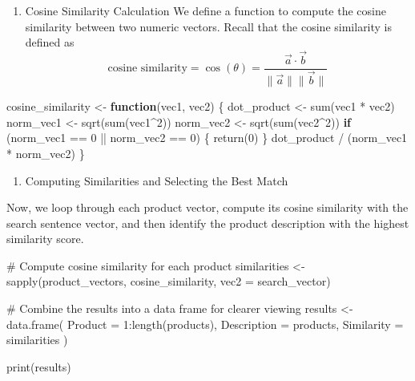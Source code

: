 \documentclass[
  letterpaper,
  DIV=11,
  numbers=noendperiod]{scrartcl}
\newenvironment{Shaded}{\begin{snugshade}}{\end{snugshade}}
\newcommand{\AttributeTok}[1]{\textcolor[rgb]{0.40,0.45,0.13}{#1}}
\newcommand{\CommentTok}[1]{\textcolor[rgb]{0.37,0.37,0.37}{#1}}
\newcommand{\ControlFlowTok}[1]{\textcolor[rgb]{0.00,0.23,0.31}{\textbf{#1}}}
\newcommand{\DecValTok}[1]{\textcolor[rgb]{0.68,0.00,0.00}{#1}}
\newcommand{\FunctionTok}[1]{\textcolor[rgb]{0.28,0.35,0.67}{#1}}
\newcommand{\NormalTok}[1]{\textcolor[rgb]{0.00,0.23,0.31}{#1}}
\newcommand{\OtherTok}[1]{\textcolor[rgb]{0.00,0.23,0.31}{#1}}
\newcommand{\SpecialCharTok}[1]{\textcolor[rgb]{0.37,0.37,0.37}{#1}}
\providecommand{\tightlist}{%
  \setlength{\itemsep}{0pt}\setlength{\parskip}{0pt}}
\begin{document}
\begin{enumerate}
\def\labelenumi{\arabic{enumi}.}
\setcounter{enumi}{1}
\tightlist
\item
  Cosine Similarity Calculation We define a function to compute the
  cosine similarity between two numeric vectors. Recall that the cosine
  similarity is defined as \[
  \text{cosine similarity} = \cos(\theta) = \frac{\vec{a} \cdot \vec{b}}{\|\vec{a}\| \|\vec{b}\|}
  \]
\end{enumerate}

\begin{Shaded}
\begin{Highlighting}[]
\NormalTok{cosine\_similarity }\OtherTok{\textless{}{-}} \ControlFlowTok{function}\NormalTok{(vec1, vec2) \{}
\NormalTok{  dot\_product }\OtherTok{\textless{}{-}} \FunctionTok{sum}\NormalTok{(vec1 }\SpecialCharTok{*}\NormalTok{ vec2)}
\NormalTok{  norm\_vec1 }\OtherTok{\textless{}{-}} \FunctionTok{sqrt}\NormalTok{(}\FunctionTok{sum}\NormalTok{(vec1}\SpecialCharTok{\^{}}\DecValTok{2}\NormalTok{))}
\NormalTok{  norm\_vec2 }\OtherTok{\textless{}{-}} \FunctionTok{sqrt}\NormalTok{(}\FunctionTok{sum}\NormalTok{(vec2}\SpecialCharTok{\^{}}\DecValTok{2}\NormalTok{))}
  \ControlFlowTok{if}\NormalTok{ (norm\_vec1 }\SpecialCharTok{==} \DecValTok{0} \SpecialCharTok{||}\NormalTok{ norm\_vec2 }\SpecialCharTok{==} \DecValTok{0}\NormalTok{) \{}
    \FunctionTok{return}\NormalTok{(}\DecValTok{0}\NormalTok{)}
\NormalTok{  \}}
\NormalTok{  dot\_product }\SpecialCharTok{/}\NormalTok{ (norm\_vec1 }\SpecialCharTok{*}\NormalTok{ norm\_vec2)}
\NormalTok{\}}
\end{Highlighting}
\end{Shaded}

\begin{enumerate}
\def\labelenumi{\arabic{enumi}.}
\setcounter{enumi}{2}
\tightlist
\item
  Computing Similarities and Selecting the Best Match
\end{enumerate}

Now, we loop through each product vector, compute its cosine similarity
with the search sentence vector, and then identify the product
description with the highest similarity score.

\begin{Shaded}
\begin{Highlighting}[]
\CommentTok{\# Compute cosine similarity for each product}
\NormalTok{similarities }\OtherTok{\textless{}{-}} \FunctionTok{sapply}\NormalTok{(product\_vectors, cosine\_similarity, }\AttributeTok{vec2 =}\NormalTok{ search\_vector)}

\CommentTok{\# Combine the results into a data frame for clearer viewing}
\NormalTok{results }\OtherTok{\textless{}{-}} \FunctionTok{data.frame}\NormalTok{(}
  \AttributeTok{Product =} \DecValTok{1}\SpecialCharTok{:}\FunctionTok{length}\NormalTok{(products),}
  \AttributeTok{Description =}\NormalTok{ products,}
  \AttributeTok{Similarity =}\NormalTok{ similarities}
\NormalTok{)}

\FunctionTok{print}\NormalTok{(results)}
\end{Highlighting}
\end{Shaded}
\end{document}
